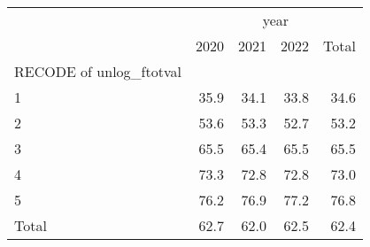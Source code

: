 \begin{tabular}{lllll}
\cline{1-5}
\multicolumn{1}{c}{} &
  \multicolumn{4}{|c}{year} \\
\multicolumn{1}{c}{} &
  \multicolumn{1}{|r}{2020} &
  \multicolumn{1}{r}{2021} &
  \multicolumn{1}{r}{2022} &
  \multicolumn{1}{r}{Total} \\
\cline{1-5}
\multicolumn{1}{l}{RECODE of unlog\_ftotval} &
  \multicolumn{1}{|r}{} &
  \multicolumn{1}{r}{} &
  \multicolumn{1}{r}{} &
  \multicolumn{1}{r}{} \\
\multicolumn{1}{l}{\hspace{1em}1} &
  \multicolumn{1}{|r}{35.9} &
  \multicolumn{1}{r}{34.1} &
  \multicolumn{1}{r}{33.8} &
  \multicolumn{1}{r}{34.6} \\
\multicolumn{1}{l}{\hspace{1em}2} &
  \multicolumn{1}{|r}{53.6} &
  \multicolumn{1}{r}{53.3} &
  \multicolumn{1}{r}{52.7} &
  \multicolumn{1}{r}{53.2} \\
\multicolumn{1}{l}{\hspace{1em}3} &
  \multicolumn{1}{|r}{65.5} &
  \multicolumn{1}{r}{65.4} &
  \multicolumn{1}{r}{65.5} &
  \multicolumn{1}{r}{65.5} \\
\multicolumn{1}{l}{\hspace{1em}4} &
  \multicolumn{1}{|r}{73.3} &
  \multicolumn{1}{r}{72.8} &
  \multicolumn{1}{r}{72.8} &
  \multicolumn{1}{r}{73.0} \\
\multicolumn{1}{l}{\hspace{1em}5} &
  \multicolumn{1}{|r}{76.2} &
  \multicolumn{1}{r}{76.9} &
  \multicolumn{1}{r}{77.2} &
  \multicolumn{1}{r}{76.8} \\
\multicolumn{1}{l}{\hspace{1em}Total} &
  \multicolumn{1}{|r}{62.7} &
  \multicolumn{1}{r}{62.0} &
  \multicolumn{1}{r}{62.5} &
  \multicolumn{1}{r}{62.4} \\
\cline{1-5}
\end{tabular}
